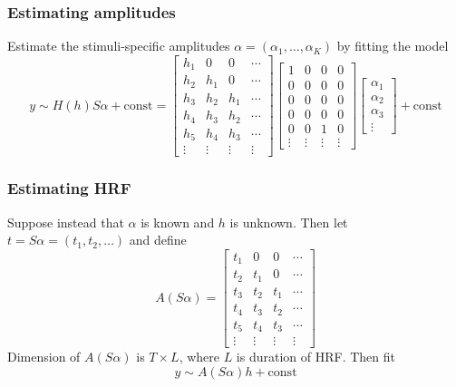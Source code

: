 \documentclass{beamer}
\begin{document}
\begin{frame}
\frametitle{Estimating amplitudes}

Estimate the stimuli-specific amplitudes $\alpha = (\alpha_1,\hdots,\alpha_K)$ by fitting the model
\[
y \sim H(h) S \alpha  + \text{const}= \begin{bmatrix}
h_1 & 0 & 0 & \cdots\\
h_2 & h_1 & 0 & \cdots\\
h_3 & h_2 & h_1 & \cdots\\
h_4 & h_3 & h_2 & \cdots\\
h_5 & h_4 & h_3 & \cdots\\
\vdots & \vdots & \vdots & \vdots
\end{bmatrix}
\begin{bmatrix}
1 & 0 & 0 & 0\\
0 & 0 & 0 & 0\\
0 & 0 & 0 & 0\\
0 & 0 & 0 & 0\\
0 & 0 & 1 & 0\\
\vdots & \vdots & \vdots & \vdots
\end{bmatrix}
\begin{bmatrix}
\alpha_1\\\alpha_2\\\alpha_3\\\vdots
\end{bmatrix}  + \text{const}
\]

\end{frame}


\begin{frame}
\frametitle{Estimating HRF}
Suppose instead that $\alpha$ is known and $h$ is unknown.  Then let $t = S\alpha = (t_1,t_2,\hdots)$ and define
\[
A(S\alpha) = \begin{bmatrix}
t_1 & 0 & 0 & \cdots\\
t_2 & t_1 & 0 & \cdots\\
t_3 & t_2 & t_1 & \cdots\\
t_4 & t_3 & t_2 & \cdots\\
t_5 & t_4 & t_3 & \cdots\\
\vdots & \vdots & \vdots & \vdots
\end{bmatrix}
\]
Dimension of $A(S\alpha)$ is $T \times L$, where $L$ is duration of HRF.
Then fit
\[
y \sim A(S\alpha) h + \text{const}
\]
\end{frame}
\end{document}
